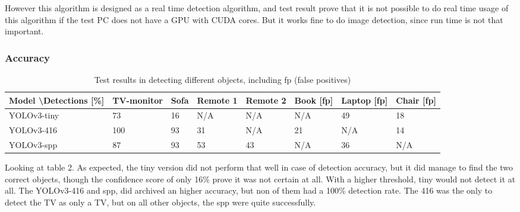 However this algorithm is designed as a real time detection algorithm, and test result prove that it is not possible to do real time usage of this algorithm if the test PC does not have a GPU with CUDA cores. But it works fine to do image detection, since run time is not that important.

\subsubsection*{Accuracy}
\begin{table}[]
\begin{tabular}{l|lllllll}
Model \textbackslash Detections {[}\%{]} & TV-monitor & Sofa & Remote 1 & Remote 2 & Book {[}fp{]} & Laptop {[}fp{]} & Chair {[}fp{]} \\ \hline
YOLOv3-tiny                              & 73         & 16   & N/A      & N/A      & N/A                       & 49                          & 18                         \\
YOLOv3-416                               & 100        & 93   & 31       & N/A      & 21                        & N/A                         & 14                         \\
YOLOv3-spp                               & 87         & 93   & 53       & 43       & N/A                       & 36                          & N/A                       
\end{tabular}
\caption{Test results in detecting different objects, including fp (false positives)}
\end{table}
Looking at table 2.
As expected, the tiny version did not perform that well in case of detection accuracy, but it did manage to find the two correct objects, though the confidence score of only 16\% prove it was not certain at all. With a higher threshold, tiny would not detect it at all. 
The YOLOv3-416 and spp, did archived an higher accuracy, but non of them had a 100\% detection rate. The 416 was the only to detect the TV as only a TV, but on all other objects, the spp were quite successfully. 